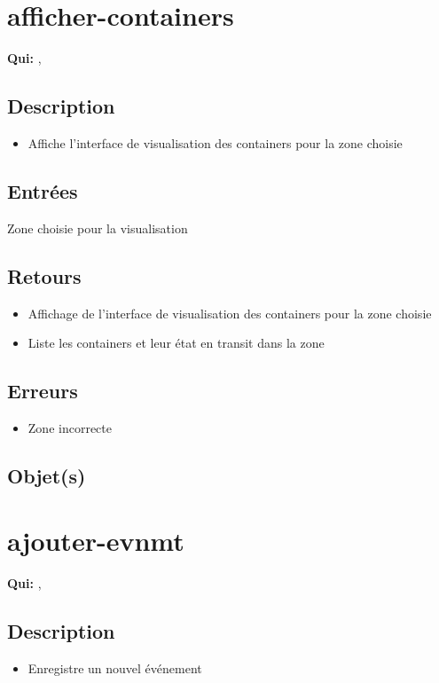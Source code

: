 \section{afficher-containers}
	\textbf{Qui:} \us, \urt

	\subsection{Description}
	\begin{itemize}
		\item Affiche l'interface de visualisation des containers pour la zone choisie
	\end{itemize}

	\subsection{Entrées}
		Zone choisie pour la visualisation

	\subsection{Retours}
	\begin{itemize}
		\item Affichage de l'interface de visualisation des containers pour la zone choisie
		\item Liste les containers et leur état en transit dans la zone
	\end{itemize}

	\subsection{Erreurs}
	\begin{itemize}
		\item Zone incorrecte \fatal
	\end{itemize}

	\subsection{Objet(s)}
		\circobjs

\section{ajouter-evnmt}
	\textbf{Qui:} \urt, \us

	\subsection{Description}
	\begin{itemize}
		\item Enregistre un nouvel événement
	\end{itemize}

